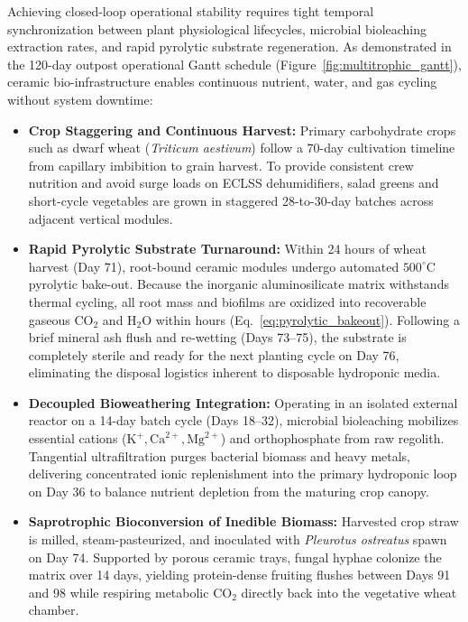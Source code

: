 Achieving closed-loop operational stability requires tight temporal synchronization between plant physiological lifecycles, microbial bioleaching extraction rates, and rapid pyrolytic substrate regeneration. As demonstrated in the 120-day outpost operational Gantt schedule (Figure~\ref{fig:multitrophic_gantt}), ceramic bio-infrastructure enables continuous nutrient, water, and gas cycling without system downtime:
\begin{itemize}
    \item \textbf{Crop Staggering and Continuous Harvest:} Primary carbohydrate crops such as dwarf wheat (\textit{Triticum aestivum}) follow a 70-day cultivation timeline from capillary imbibition to grain harvest. To provide consistent crew nutrition and avoid surge loads on ECLSS dehumidifiers, salad greens and short-cycle vegetables are grown in staggered 28-to-30-day batches across adjacent vertical modules.
    \item \textbf{Rapid Pyrolytic Substrate Turnaround:} Within 24 hours of wheat harvest (Day 71), root-bound ceramic modules undergo automated $500^\circ\mathrm{C}$ pyrolytic bake-out. Because the inorganic aluminosilicate matrix withstands thermal cycling, all root mass and biofilms are oxidized into recoverable gaseous $\mathrm{CO}_2$ and $\mathrm{H}_2\mathrm{O}$ within hours (Eq.~\ref{eq:pyrolytic_bakeout}). Following a brief mineral ash flush and re-wetting (Days 73--75), the substrate is completely sterile and ready for the next planting cycle on Day 76, eliminating the disposal logistics inherent to disposable hydroponic media.
    \item \textbf{Decoupled Bioweathering Integration:} Operating in an isolated external reactor on a 14-day batch cycle (Days 18--32), microbial bioleaching mobilizes essential cations ($\mathrm{K}^+, \mathrm{Ca}^{2+}, \mathrm{Mg}^{2+}$) and orthophosphate from raw regolith. Tangential ultrafiltration purges bacterial biomass and heavy metals, delivering concentrated ionic replenishment into the primary hydroponic loop on Day 36 to balance nutrient depletion from the maturing crop canopy.
    \item \textbf{Saprotrophic Bioconversion of Inedible Biomass:} Harvested crop straw is milled, steam-pasteurized, and inoculated with \textit{Pleurotus ostreatus} spawn on Day 74. Supported by porous ceramic trays, fungal hyphae colonize the matrix over 14 days, yielding protein-dense fruiting flushes between Days 91 and 98 while respiring metabolic $\mathrm{CO}_2$ directly back into the vegetative wheat chamber.
\end{itemize}

